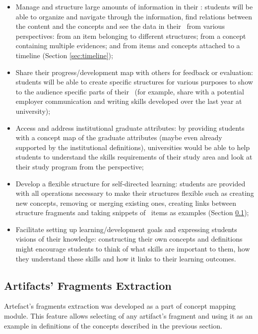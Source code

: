 \begin{itemize}
  \item Manage and structure large amounts of information in their \ep:
  students will be able to organize and navigate through the information, find
  relations between the content and the concepts and see the data in their
  \ep~from various perspectives: from an item belonging to different
  structures; from a concept containing multiple evidences; and from items and
  concepts attached to a timeline (Section \ref{sec:timeline});

\item Share their progress/development map with others for feedback or
evaluation: students will be able to create specific structures for various
purposes to show to the audience specific parts of their \ep~(for example,
share with a potential employer communication and writing skills developed over
the last year at university);

\item Access and address institutional graduate attributes: by providing
students with a concept map of the graduate attributes (maybe even already
supported by the institutional definitions), universities would be able to
help students to understand the skills requirements of their study area and look
at their study program from the \LLLs perspective;

\item Develop a flexible structure for self-directed learning: students are
provided with all operations necessary to make their structures flexible such as
creating new concepts, removing or merging existing ones, creating links between
structure fragments and taking snippets of \ep~items as examples (Section
\ref{sec:frag});

\item Facilitate setting up learning/development goals and expressing students
visions of their knowledge: constructing their own concepts and definitions
might encourage students to think of what skills are important to them, how they
understand these skills and how it links to their learning outcomes.
\end{itemize}

\subsection{Artifacts' Fragments Extraction}
\label{sec:frag}

Artefact's fragments extraction was developed as a part of concept mapping
module. This feature allows selecting of any artifact's fragment and using
it as an example in definitions of the concepts described in the previous
section. 


